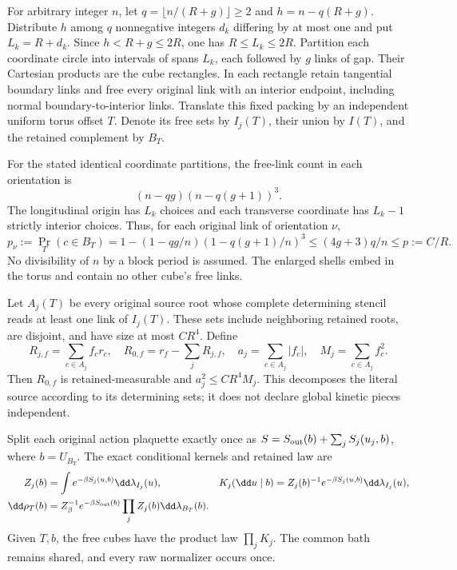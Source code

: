 For arbitrary integer \(n\), let \(q=\lfloor n/(R+g)\rfloor\ge2\) and \(h=n-q(R+g)\). Distribute \(h\) among \(q\) nonnegative integers \(d_k\) differing by at most one and put \(L_k=R+d_k\). Since \(h<R+g\le2R\), one has \(R\le L_k\le2R\). Partition each coordinate circle into intervals of spans \(L_k\), each followed by \(g\) links of gap. Their Cartesian products are the cube rectangles. In each rectangle retain tangential boundary links and free every original link with an interior endpoint, including normal boundary-to-interior links. Translate this fixed packing by an independent uniform torus offset \(T\). Denote its free sets by \(I_j(T)\), their union by \(I(T)\), and the retained complement by \(B_T\).

For the stated identical coordinate partitions, the free-link count in each orientation is
\[
 (n-qg)(n-q(g+1))^3.
\]
The longitudinal origin has \(L_k\) choices and each transverse coordinate has \(L_k-1\) strictly interior choices. Thus, for each original link of orientation \(\nu\),
\begin{equation}
 p_\nu:=\Pr_T(c\in B_T)
 =1-(1-qg/n)(1-q(g+1)/n)^3
 \le (4g+3)q/n\le p:=C/R.
 \label{cb:retainedfraction}
\end{equation}
No divisibility of \(n\) by a block period is assumed. The enlarged shells embed in the torus and contain no other cube's free links.

Let \(A_j(T)\) be every original source root whose complete determining stencil reads at least one link of \(I_j(T)\). These sets include neighboring retained roots, are disjoint, and have size at most \(CR^4\). Define
\begin{equation}
 R_{j,f}=\sum_{c\in A_j}f_cr_c,\quad
 R_{0,f}=r_f-\sum_jR_{j,f},\quad
 a_j=\sum_{c\in A_j}|f_c|,\quad M_j=\sum_{c\in A_j}f_c^2.
 \label{cb:completepackets}
\end{equation}
Then \(R_{0,f}\) is retained-measurable and \(a_j^2\le CR^4M_j\). This decomposes the literal source according to its determining sets; it does not declare global kinetic pieces independent.

Split each original action plaquette exactly once as
\(S=S_{\rm out}(b)+\sum_jS_j(u_j,b)\), where \(b=U_{B_T}\). The exact conditional kernels and retained law are
\begin{align}
 Z_j(b)&=\int e^{-\beta S_j(u,b)}\dd\lambda_{I_j}(u),&
 K_j(\dd u\mid b)&=Z_j(b)^{-1}e^{-\beta S_j(u,b)}\dd\lambda_{I_j}(u),\notag\\
 \dd\rho_T(b)&=Z_\beta^{-1}e^{-\beta S_{\rm out}(b)}
                 \prod_jZ_j(b)\dd\lambda_{B_T}(b).
 \label{cb:rawlaw}
\end{align}
Given \(T,b\), the free cubes have the product law \(\prod_jK_j\). The common bath remains shared, and every raw normalizer occurs once.


